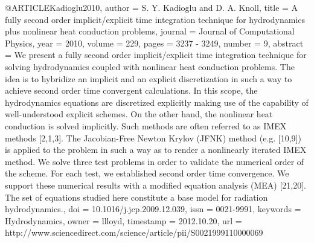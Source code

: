 {@ARTICLE{Kadioglu2010,
  author = {S. Y. Kadioglu and D. A. Knoll},
  title = {A fully second order implicit/explicit time integration technique
	for hydrodynamics plus nonlinear heat conduction problems},
  journal = {Journal of Computational Physics},
  year = {2010},
  volume = {229},
  pages = {3237 - 3249},
  number = {9},
  abstract = {We present a fully second order implicit/explicit time integration
	technique for solving hydrodynamics coupled with nonlinear heat conduction
	problems. The idea is to hybridize an implicit and an explicit discretization
	in such a way to achieve second order time convergent calculations.
	In this scope, the hydrodynamics equations are discretized explicitly
	making use of the capability of well-understood explicit schemes.
	On the other hand, the nonlinear heat conduction is solved implicitly.
	Such methods are often referred to as IMEX methods [2,1,3]. The Jacobian-Free
	Newton Krylov (JFNK) method (e.g. [10,9]) is applied to the problem
	in such a way as to render a nonlinearly iterated IMEX method. We
	solve three test problems in order to validate the numerical order
	of the scheme. For each test, we established second order time convergence.
	We support these numerical results with a modified equation analysis
	(MEA) [21,20]. The set of equations studied here constitute a base
	model for radiation hydrodynamics.},
  doi = {10.1016/j.jcp.2009.12.039},
  issn = {0021-9991},
  keywords = {Hydrodynamics},
  owner = {llloyd},
  timestamp = {2012.10.20},
  url = {http://www.sciencedirect.com/science/article/pii/S0021999110000069}
}

}
